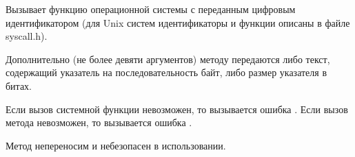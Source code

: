 \begin{methodlist}
  Вызывает функцию операционной системы с переданным цифровым идентификатором (для Unix систем идентификаторы и функции описаны в файле syscall.h).

  Дополнительно (не более девяти аргументов) методу передаются либо текст, содержащий указатель на последовательность байт, либо размер указателя в битах.

  Если вызов системной функции невозможен, то вызывается ошибка .
  Если вызов метода невозможен, то вызывается ошибка .

  Метод непереносим и небезопасен в использовании.
\end{methodlist}